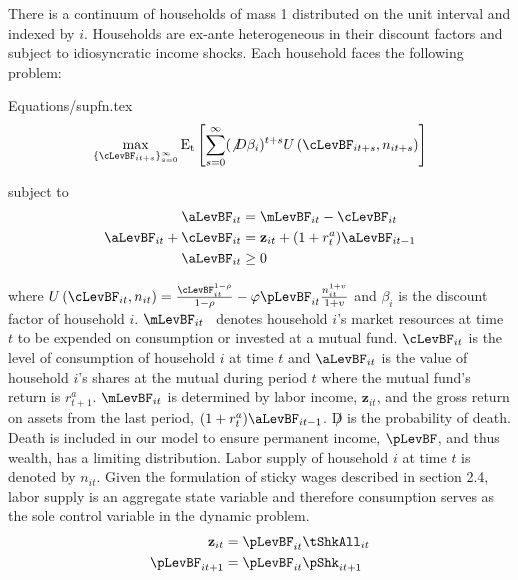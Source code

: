 \documentclass[titlepage]{\econtex}\providecommand{\texname}{BufferStockTheory}
\providecommand{\EqDir}{Equations}
\begin{document}
There is a continuum of households of mass 1 distributed on the unit
interval and indexed by $i$. Households are ex-ante heterogeneous in their discount factors and subject to idiosyncratic income shocks.  Each household faces the following problem:

\begin{verbatimwrite}{\EqDir/supfn.tex}
\begin{eqnarray}
  \label{eq:supfn}
  \max_{\{\cLevBF_{it+s}\}_{s=0}^{\infty}} \mathrm{E_{t}}\left[\sum_{s=0}^{\infty} (\not D \beta_{i})^{t+s} U\left(  \cLevBF_{i t+s}, n_{i t+s}\right)\right]
\end{eqnarray}
\end{verbatimwrite}
 

subject to 
\begin{align*}
\aLevBF_{it}     &= \mLevBF_{it} - \cLevBF_{it}   \label{eq:DBCparts} \\
\aLevBF_{it} +\cLevBF_{it}    &= \mathbf{z}_{it} +   (1 + r^{a}_{t} ) \aLevBF_{it-1}   \\ 
\aLevBF_{it}  &\geq 0 \\
\end{align*}

where
$U\left(\cLevBF_{i t}, n_{i t}\right) = \frac{\cLevBF_{i t}^{1-\rho}}{1 -\rho} - \varphi \pLevBF_{it} \frac{n_{it}^{1+v}}{1+v}$  and $\beta_{i}$ is the discount factor of household $i$. $\mLevBF_{it}$ \ denotes household $i$'s market resources at time $t$ to be expended on consumption or invested at a mutual fund. $\cLevBF_{it}$ is the level of consumption of household $i$ at time $t$ and  $ \aLevBF_{it}$ is the value of household $i$'s shares at the mutual during period $t$ where the mutual fund's return is $r_{t+1}^{a}$.  $\mLevBF_{it}$ is determined by labor income,  $\mathbf{z}_{it}$, and the gross return on assets from the last period, $(1+r_{t}^{a}) \aLevBF_{it-1} $. $\not D$ is the probability of death. Death is included in our model to ensure permanent income, $\pLevBF$, and thus wealth, has a limiting distribution.   Labor supply of household $i$ at time $t$ is denoted by $n_{it}$.  Given the formulation of sticky wages described in section 2.4, labor supply is an aggregate state variable and therefore consumption serves as the sole control variable in the dynamic problem.  \\





\begin{align*}
\mathbf{z}_{it} &= \pLevBF_{it}\tShkAll_{it} \\
\pLevBF_{it+1} &=\pLevBF_{it} \pShk_{it+1} \\
\end{align*}
\end{document}
